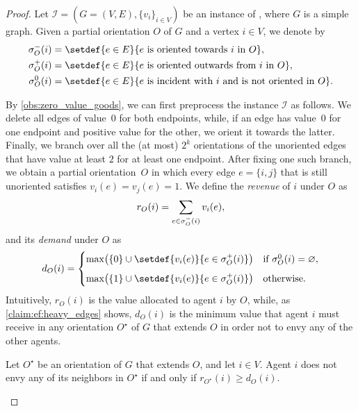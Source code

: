 \begin{proof}
    Let $\mathcal{I} = (G=(V,E),\{v_i\}_{i \in V})$ be an instance of \EFo, where $G$ is a simple graph.
    Given a partial orientation $O$ of $G$ and a vertex $i \in V$, we denote by
    \begin{align*}
        \indeg_O(i) &= \setdef{ e \in E }{ e \text{ is oriented towards } i \text{ in } O },\\
        \outdeg_O(i) &= \setdef{ e \in E }{ e \text{ is oriented outwards from } i \text{ in } O },\\
        \unorienteddeg_O(i) &= \setdef{ e \in E }{ e \text{ is incident with } i \text{ and is not oriented in } O }.
    \end{align*}


    By \cref{obs:zero_value_goods}, we can first preprocess the instance $\mathcal{I}$ as follows.
    We delete all edges of value~$0$ for both endpoints, while,
    if an edge has value~$0$ for one endpoint and positive value for the other,
    we orient it towards the latter.
    Finally, we branch over all the (at most) $2^k$ orientations of the unoriented edges that have value at least $2$ for at least one endpoint.
    After fixing one such branch, we obtain a partial orientation~$O$ in which
    every edge $e = \{i,j\}$ that is still unoriented satisfies $v_i(e) = v_j(e) = 1$.
    We define the \emph{revenue} of $i$ under $O$ as
    \[
        r_O(i) = \sum_{e \in \sigma^-_O(i)} v_i(e),
    \]
    and its \emph{demand} under $O$ as
    \[
        d_O(i) =
        \begin{cases}
            \max\bigl( \{0\} \cup \setdef{ v_i(e) }{ e \in \outdeg_O(i) } \bigr)
                & \text{if } \unorienteddeg_O(i) = \varnothing,\\[2mm]

            \max\bigl( \{1\} \cup \setdef{ v_i(e) }{ e \in \outdeg_O(i) } \bigr)
                & \text{otherwise.}
        \end{cases}
    \]
    Intuitively, $r_O(i)$ is the value allocated to agent $i$ by $O$,
    while, as \cref{claim:ef:heavy_edges} shows, $d_O(i)$ is the minimum value that agent $i$ must receive in any orientation $O^\star$ of $G$ that extends $O$
    in order not to envy any of the other agents.

    \begin{claim}\label{claim:ef:heavy_edges}
        Let $O^\star$ be an orientation of $G$ that extends $O$, and let $i \in V$.
        Agent $i$ does not envy any of its neighbors in $O^\star$ if and only if $r_{O^\star}(i) \ge d_{O}(i)$.
    \end{claim}


\end{proof}
